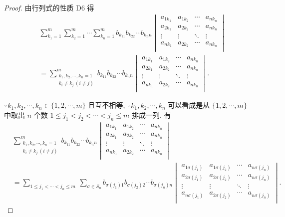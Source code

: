 \documentclass[color=black,device=normal,lang=cn,mode=geye]{elegantnote}
\begin{document}
\begin{proof}
    由行列式的性质 D6 得
    \begin{align*}
        & \sum_{k_1=1}^m\sum_{k_2=1}^m\cdots\sum_{k_n=1}^mb_{k_11}b_{k_22}\cdots b_{k_nn}\begin{vmatrix}
            a_{1k_1} & a_{1k_2} & \cdots & a_{nk_n} \\
            a_{2k_1} & a_{2k_2} & \cdots & a_{nk_n} \\
            \vdots & \vdots & \ddots & \vdots \\
            a_{nk_1} & a_{2k_2} & \cdots & a_{nk_n} \\
        \end{vmatrix} \\
        & =\sum_{\substack{k_1,k_2,\cdots,k_n=1\\k_i\neq k_j\ (i\neq j)}}^mb_{k_11}b_{k_22}\cdots b_{k_nn}\begin{vmatrix}
            a_{1k_1} & a_{1k_2} & \cdots & a_{nk_n} \\
            a_{2k_1} & a_{2k_2} & \cdots & a_{nk_n} \\
            \vdots & \vdots & \ddots & \vdots \\
            a_{nk_1} & a_{2k_2} & \cdots & a_{nk_n} \\
        \end{vmatrix}.
    \end{align*}

    $\because k_1,k_2,\cdots,k_n\in\{1,2,\cdots,m\}$ 且互不相等, $\therefore k_1,k_2,\cdots,k_n$ 可以看成是从 $\{1,2,\cdots,m\}$ 中取出 $n$ 个数 $1\leq j_1<j_2<\cdots<j_n\leq m$ 排成一列. 有
    \begin{align*}
        & \sum_{\substack{k_1,k_2,\cdots,k_n=1\\k_i\neq k_j\ (i\neq j)}}^mb_{k_11}b_{k_22}\cdots b_{k_nn}\begin{vmatrix}
            a_{1k_1} & a_{1k_2} & \cdots & a_{nk_n} \\
            a_{2k_1} & a_{2k_2} & \cdots & a_{nk_n} \\
            \vdots & \vdots & \ddots & \vdots \\
            a_{nk_1} & a_{2k_2} & \cdots & a_{nk_n} \\
        \end{vmatrix} \\
        & =\sum\limits_{1\leq j_1<\cdots<j_n\leq m}\ \sum_{\sigma\in S_n}b_{\sigma(j_1)1}b_{\sigma(j_2)2}\cdots b_{\sigma(j_n)n}\begin{vmatrix}
            a_{1\sigma(j_1)} & a_{1\sigma(j_2)} & \cdots & a_{n\sigma(j_n)} \\
            a_{2\sigma(j_1)} & a_{2\sigma(j_2)} & \cdots & a_{n\sigma(j_n)} \\
            \vdots & \vdots & \ddots & \vdots \\
            a_{n\sigma(j_1)} & a_{2\sigma(j_2)} & \cdots & a_{n\sigma(j_n)} \\
        \end{vmatrix}.
    \end{align*}


\end{proof}
\end{document}

